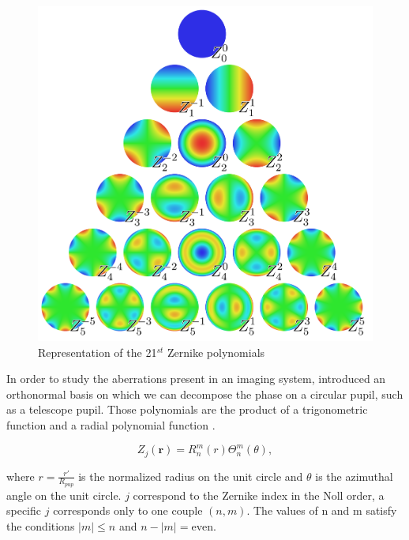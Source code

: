 \begin{figure}
\begin{center}
\includegraphics[width=\textwidth,angle=0]{Figures/Zernike_polynomials}
\decoRule
\caption[Representation of the 21 first Zernike polynomials]{Representation of the 21$^{st}$ Zernike polynomials \citep{ZernikeWiki}}
\label{fig:Zernike_polynomials}
\end{center}
\end{figure}


In order to study the aberrations present in an imaging system, \citet{zernike1934} introduced an orthonormal basis on which we can decompose the phase on a circular pupil, such as a telescope pupil. Those polynomials are the product of a trigonometric function and a radial polynomial function \citep{Noll_1976}.

\begin{equation}
Z_j(\mathbf{r}) = R_n^m(r)\Theta^m_n(\theta),
\label{eqt:ZernikePol}
\end{equation}

where $r=\frac{r'}{R_{pup}}$ is the normalized radius on the unit circle and $\theta$ is the azimuthal angle on the unit circle. $j$ correspond to the Zernike index in the Noll order, a specific $j$ corresponds only to one couple $(n,m)$. The values of n and m satisfy the conditions $|m| \leq n$ and $n - |m| = \mathrm{even}$.

